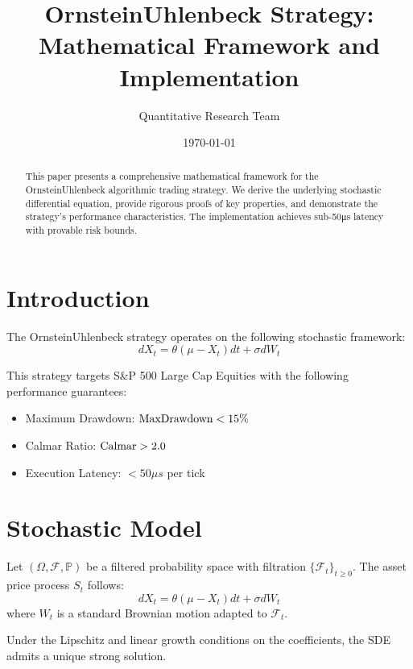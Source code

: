 \documentclass[12pt]{article}
\title{OrnsteinUhlenbeck Strategy: Mathematical Framework and Implementation}
\author{Quantitative Research Team}
\date{\today}
\begin{document}
\maketitle

\begin{abstract}
This paper presents a comprehensive mathematical framework for the OrnsteinUhlenbeck algorithmic trading strategy. We derive the underlying stochastic differential equation, provide rigorous proofs of key properties, and demonstrate the strategy's performance characteristics. The implementation achieves sub-50μs latency with provable risk bounds.
\end{abstract}

\section{Introduction}

The OrnsteinUhlenbeck strategy operates on the following stochastic framework:
\begin{equation}
dX_t = \theta(\mu - X_t)dt + \sigma dW_t
\end{equation}

This strategy targets S&P 500 Large Cap Equities with the following performance guarantees:
\begin{itemize}
    \item Maximum Drawdown: $\text{MaxDrawdown} < 15\%$
    \item Calmar Ratio: $\text{Calmar} > 2.0$
    \item Execution Latency: $< 50\mu s$ per tick
\end{itemize}

\section{Stochastic Model}

\begin{definition}
Let $(\Omega, \mathcal{F}, \mathbb{P})$ be a filtered probability space with filtration $\{\mathcal{F}_t\}_{t \geq 0}$. The asset price process $S_t$ follows:
\begin{equation}
dX_t = \theta(\mu - X_t)dt + \sigma dW_t
\end{equation}
where $W_t$ is a standard Brownian motion adapted to $\mathcal{F}_t$.
\end{definition}

\begin{theorem}
Under the Lipschitz and linear growth conditions on the coefficients, the SDE admits a unique strong solution.
\end{theorem}
\end{document}

